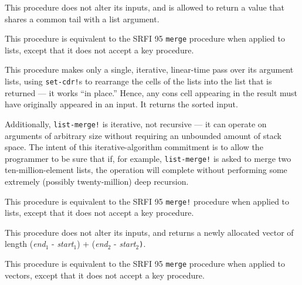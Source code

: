 \begin{entry}{%
  }

  This procedure does not alter its inputs, and is allowed to return a
  value that shares a common tail with a list argument.

  This procedure is equivalent to the SRFI 95 \texttt{merge} procedure
  when applied to lists, except that it does not accept a key
  procedure.
\end{entry}

\begin{entry}{%
  }

  This procedure makes only a single, iterative, linear-time pass over
  its argument lists, using \texttt{set-cdr!}s to rearrange the cells
  of the lists into the list that is returned --- it works ``in
  place.'' Hence, any cons cell appearing in the result must have
  originally appeared in an input. It returns the sorted input.

  Additionally, \texttt{list-merge!} is iterative, not recursive ---
  it can operate on arguments of arbitrary size without requiring an
  unbounded amount of stack space. The intent of this
  iterative-algorithm commitment is to allow the programmer to be sure
  that if, for example, \texttt{list-merge!} is asked to merge two
  ten-million-element lists, the operation will complete without
  performing some extremely (possibly twenty-million) deep recursion.

  This procedure is equivalent to the SRFI 95 \texttt{merge!}
  procedure when applied to lists, except that it does not accept a
  key procedure.
\end{entry}

\begin{entry}{%
  }

  This procedure does not alter its inputs, and returns a newly
  allocated vector of length (\emph{end$_1$} - \emph{start$_1$}) +
  (\emph{end$_2$} - \emph{start$_2$}\texttt{)}.

This procedure is equivalent to the SRFI 95 \texttt{merge} procedure
when applied to vectors, except that it does not accept a key procedure.
\end{entry}

